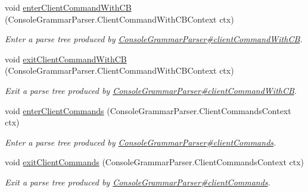 \begin{DoxyCompactItemize}
void \hyperlink{interfacegov_1_1nasa_1_1jpf_1_1inspector_1_1client_1_1parser_1_1_console_grammar_listener_a3cf0f327d6e8b7004b02c68d4dac6581}{enter\+Client\+Command\+With\+CB} (Console\+Grammar\+Parser.\+Client\+Command\+With\+C\+B\+Context ctx)
\begin{DoxyCompactList}\small\item\em Enter a parse tree produced by \hyperlink{classgov_1_1nasa_1_1jpf_1_1inspector_1_1client_1_1parser_1_1_console_grammar_parser_af370380e1a8bd00a938ccef2cf6a7b1b}{Console\+Grammar\+Parser\#client\+Command\+With\+CB}. \end{DoxyCompactList}\item 
void \hyperlink{interfacegov_1_1nasa_1_1jpf_1_1inspector_1_1client_1_1parser_1_1_console_grammar_listener_a75be843ca602ca1d7de2399b567eeb6e}{exit\+Client\+Command\+With\+CB} (Console\+Grammar\+Parser.\+Client\+Command\+With\+C\+B\+Context ctx)
\begin{DoxyCompactList}\small\item\em Exit a parse tree produced by \hyperlink{classgov_1_1nasa_1_1jpf_1_1inspector_1_1client_1_1parser_1_1_console_grammar_parser_af370380e1a8bd00a938ccef2cf6a7b1b}{Console\+Grammar\+Parser\#client\+Command\+With\+CB}. \end{DoxyCompactList}\item 
void \hyperlink{interfacegov_1_1nasa_1_1jpf_1_1inspector_1_1client_1_1parser_1_1_console_grammar_listener_ae2e58ef4774cb37fc13404175bc72683}{enter\+Client\+Commands} (Console\+Grammar\+Parser.\+Client\+Commands\+Context ctx)
\begin{DoxyCompactList}\small\item\em Enter a parse tree produced by \hyperlink{classgov_1_1nasa_1_1jpf_1_1inspector_1_1client_1_1parser_1_1_console_grammar_parser_a72762b83792e740b30d2732282143634}{Console\+Grammar\+Parser\#client\+Commands}. \end{DoxyCompactList}\item 
void \hyperlink{interfacegov_1_1nasa_1_1jpf_1_1inspector_1_1client_1_1parser_1_1_console_grammar_listener_ae2ac50ce0737caeca30824d34bf147d3}{exit\+Client\+Commands} (Console\+Grammar\+Parser.\+Client\+Commands\+Context ctx)
\begin{DoxyCompactList}\small\item\em Exit a parse tree produced by \hyperlink{classgov_1_1nasa_1_1jpf_1_1inspector_1_1client_1_1parser_1_1_console_grammar_parser_a72762b83792e740b30d2732282143634}{Console\+Grammar\+Parser\#client\+Commands}. \end{DoxyCompactList}\item 

\end{DoxyCompactItemize}
